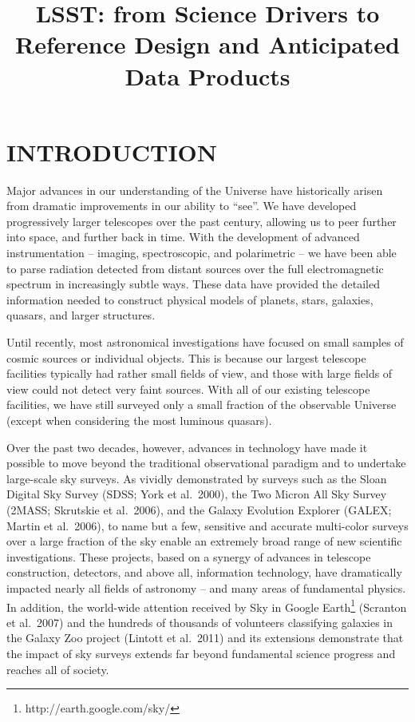 \documentclass{emulateapj}
\begin{document}
\title{LSST: from Science Drivers to Reference Design and Anticipated Data Products} 






\section{INTRODUCTION}

Major advances in our understanding of the Universe have historically arisen
from dramatic improvements in our ability to ``see''. We have developed
progressively larger telescopes over the past century, allowing us 
to peer further into space, and further back in time. With the development of 
advanced instrumentation -- imaging, spectroscopic, and polarimetric -- we 
have been able to parse radiation detected from distant sources over the 
full electromagnetic spectrum in increasingly subtle ways. 
These data have provided the detailed information needed to construct physical 
models of planets, stars, galaxies, quasars, and larger structures. 

Until recently, most astronomical investigations have focused on small samples 
of cosmic sources or individual objects. This is because our largest telescope 
facilities typically had rather small fields of view, and those with large
fields of view could not detect very faint sources. With all of our existing 
telescope facilities, we have still surveyed only a small fraction of the 
observable Universe (except when considering the most luminous quasars). 

Over the past two decades, however, advances in technology have made it possible to 
move beyond the traditional observational paradigm and to undertake large-scale 
sky surveys. As vividly demonstrated by surveys such as the Sloan Digital Sky 
Survey (SDSS; York et al.~2000), the Two Micron All Sky Survey (2MASS;
Skrutskie et al.~2006), and the Galaxy Evolution Explorer (GALEX; Martin et
al.~2006), to name but a few, sensitive and accurate 
multi-color surveys over a large fraction of the sky enable an extremely broad range of 
new scientific investigations. These projects, based on a synergy of advances in 
telescope construction, detectors, and above all, information technology, 
have dramatically impacted nearly all fields of astronomy 
-- and many areas of fundamental physics. In addition, the world-wide attention 
received by Sky in Google Earth\footnote{http://earth.google.com/sky/}
(Scranton et al.~2007)  and the hundreds of thousands of volunteers
classifying galaxies in the Galaxy Zoo project (Lintott et al.~2011)
and its extensions 
demonstrate that the impact of sky surveys extends
far beyond fundamental science progress and reaches all of society.
\end{document}
